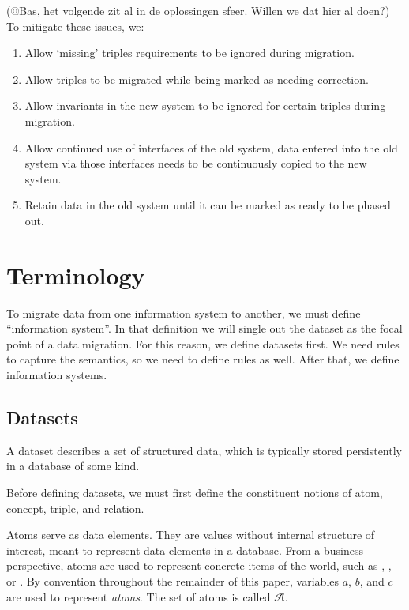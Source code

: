 \documentclass{elsarticle}
\begin{document}
(@Bas, het volgende zit al in de oplossingen sfeer. Willen we dat hier al doen?)
   To mitigate these issues, we:
   
   \begin{enumerate}
   \item Allow `missing' triples requirements to be ignored during migration.
   \item Allow triples to be migrated while being marked as needing correction.
   \item Allow invariants in the new system to be ignored for certain triples during migration.
   \item Allow continued use of interfaces of the old system, data entered into the old system via those interfaces needs to be continuously copied to the new system.
   \item Retain data in the old system until it can be marked as ready to be phased out.
   \end{enumerate}   

\section{Terminology}
\label{sct:Terminology}
   To migrate data from one information system to another,
   we must define ``information system''.
   In that definition we will single out the dataset as the focal point of a data migration.
   For this reason, we define datasets first.
   We need rules to capture the semantics, so we need to define rules as well.
   After that, we define information systems.

\subsection{Datasets}
\label{sct:Datasets}
   A dataset describes a set of structured data, which is typically stored persistently in a database of some kind.

   Before defining datasets, we must first define the constituent notions of atom, concept, triple, and relation.
   
   Atoms serve as data elements.
   They are values without internal structure of interest, meant to represent data elements in a database.
   From a business perspective, atoms are used to represent concrete items of the world,
   such as , , or .
   By convention throughout the remainder of this paper, variables $a$, $b$, and $c$ are used to represent \emph{atoms}.
   The set of atoms is called $\mathcal{A}$.
   
\end{document}
